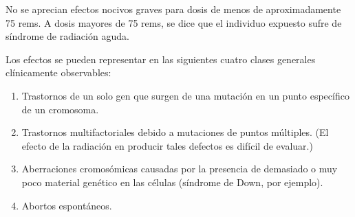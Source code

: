 \documentclass{beamer}
\begin{document}

\begin{frame}
	
	\begin{block}{}
			No se aprecian efectos nocivos graves para dosis de menos de aproximadamente 75 rems. A dosis mayores de 75 rems, se dice que el individuo expuesto sufre de síndrome de radiación aguda.
	\end{block}

\end{frame}


\begin{frame}
	Los efectos se pueden representar en las siguientes cuatro clases generales clínicamente observables:
	
	\begin{enumerate}
		\item  Trastornos de un solo gen que surgen de una mutación en un punto específico de un cromosoma.
		\item Trastornos multifactoriales debido a mutaciones de puntos múltiples. (El efecto de la radiación
		en producir tales defectos es difícil de evaluar.)
		\item Aberraciones cromosómicas causadas por la presencia de demasiado o muy poco
		material genético en las células (síndrome de Down, por ejemplo).
		\item Abortos espontáneos.	
	\end{enumerate}
	
\end{frame}


\end{document}
